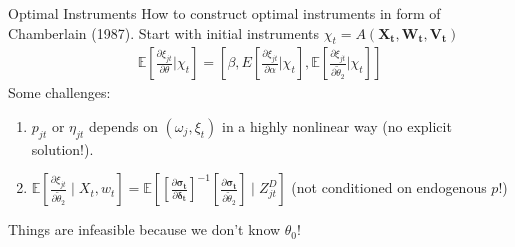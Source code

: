 \documentclass[aspectratio=169,10pt]{beamer}
\begin{document}


\begin{frame}{Optimal Instruments}
How to construct optimal instruments in form of Chamberlain (1987). Start with initial instruments $\chi_t = A\left(\symbf{X_t},\symbf{W_t},\symbf{V_t}\right)$
\begin{eqnarray*}
\mathbb{E}\left[\frac{\partial \xi_{jt}}{\partial \theta} | \chi_{t} \right] = \left[\beta, E\left[\frac{\partial \xi_{jt}}{\partial \alpha} | \chi_{t} \right] ,
 \mathbb{E}\left[\frac{\partial \xi_{jt}}{\partial \widetilde{\theta}_2} | \chi_{t} \right] \right]
\end{eqnarray*}
Some challenges:
\begin{enumerate}
\item $p_{jt}$ or $\eta_{jt}$ depends on $(\omega_{j},\xi_{t})$ in a highly nonlinear way (no explicit solution!).
\item $\mathbb{E}\left[\frac{\partial \xi_{jt}}{\partial \widetilde{\theta}_2} \mid X_t, w_{t} \right] =\mathbb{E}\left[\left[\frac{\partial \symbf{\sigma_t}}{\partial \symbf{\delta_t}}\right]^{-1} 
\left[\frac{\partial \symbf{\sigma_t}}{\partial \widetilde{\theta}_2}\right] \mid Z_{jt}^D \right]$  (not conditioned on endogenous $p$!)
\end{enumerate}
Things are \alert{infeasible} because we don't know $\theta_0$!
\end{frame}
\end{document}
